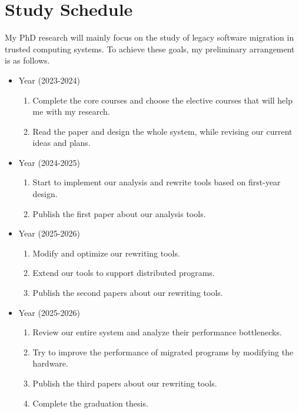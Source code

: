 \section{Study Schedule}
My PhD research will mainly focus on the study of legacy software migration in trusted computing systems.
To achieve these goals, my preliminary arrangement is as follows.
\begin{itemize}
    \item {} Year (2023-2024)
    \begin{enumerate}
        \item Complete the core courses and choose the elective courses
        that will help me with my research.
        \item Read the paper and design the whole system, while revising
        our current ideas and plans.
    \end{enumerate}
    \item {} Year (2024-2025)
        \begin{enumerate}
            \item Start to implement our analysis and rewrite tools based on
            first-year design.
            \item Publish the first paper about our analysis tools.
        \end{enumerate}
    \item {} Year (2025-2026)
        \begin{enumerate}
            \item Modify and optimize our rewriting tools.
            \item Extend our tools to support distributed programs.
            \item Publish the second papers about our rewriting tools.
        \end{enumerate}
    \item {} Year (2025-2026)
        \begin{enumerate}
            \item Review our entire system and analyze their performance bottlenecks.
            \item Try to improve the performance of migrated programs by
            modifying the hardware.
            \item Publish the third papers about our rewriting tools.
            \item Complete the graduation thesis.
        \end{enumerate}
\end{itemize}


